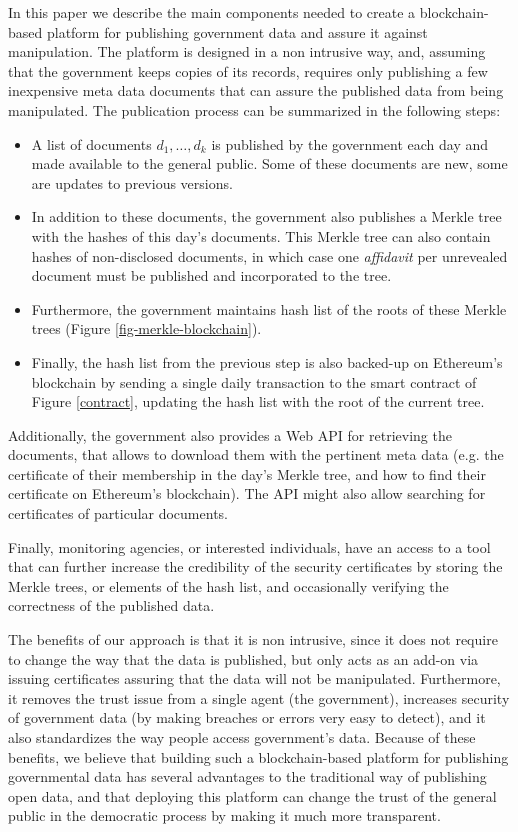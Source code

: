 
In this paper we describe the main components needed to create a blockchain-based platform for publishing government data and assure it against manipulation. The platform is designed in a non intrusive way, and, assuming that the government keeps copies of its records, requires only publishing a few inexpensive meta data documents that can assure the published data from being manipulated. The publication process can be summarized in the following steps:
\begin{itemize}
\item A list of documents $d_1,\ldots ,d_k$ is published by the government each day and made available to the general public. Some of these documents are new, some are updates to previous versions.
\item In addition to these documents, the government also publishes a Merkle tree with the hashes of this day's documents. This Merkle tree can also contain hashes of non-disclosed documents, in which case one \textit{affidavit} per unrevealed document must be published and incorporated to the tree.
\item Furthermore, the government maintains hash list of the roots of these Merkle trees (Figure \ref{fig-merkle-blockchain}).
\item Finally, the hash list from the previous step is also backed-up on Ethereum's blockchain by sending a single daily transaction to the smart contract of Figure \ref{contract}, updating the hash list with the root of the current tree.
\end{itemize}

Additionally, the government also provides a Web API for retrieving the documents, that allows to download them with the pertinent meta data (e.g. the certificate of their membership in the day's Merkle tree, and how to find their certificate on Ethereum's blockchain). The API might also allow searching for certificates of particular documents.

Finally, monitoring agencies, or interested individuals, have an access to a tool that can further increase the credibility of the security certificates by storing the Merkle trees, or elements of the hash list, and occasionally verifying the correctness of the published data.

The benefits of our approach is that it is non intrusive, since it does not require to change the way that the data is published, but only acts as an add-on via issuing certificates assuring that the data will not be manipulated. Furthermore, it removes the trust issue from a single agent (the government), increases security of government data (by making breaches or errors very easy to detect), and it also standardizes the way people access government's data. Because of these benefits, we believe that building such a blockchain-based platform for publishing governmental data has several advantages to the traditional way of publishing open data, and that deploying this platform can change the trust of the general public in the democratic process by making it much more transparent.